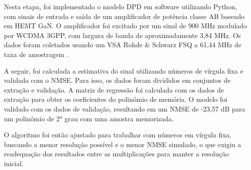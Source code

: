 Nesta etapa, foi implementado o modelo DPD em software utilizando Python, com sinais de entrada e saída de um amplificador de potência classe AB baseado em HEMT GaN. O amplificador foi excitado por um sinal de 900 MHz modulado por WCDMA 3GPP, com largura de banda de aproximadamente 3,84 MHz. Os dados foram coletados usando um VSA Rohde \& Schwarz FSQ a 61,44 MHz de taxa de amostragem \cite{Bonfim2016}. 

A seguir, foi calculada a estimativa do sinal utilizando números de vírgula fixa e validada com o NMSE. Para isso, os dados foram divididos em conjuntos de extração e validação. A matriz de regressão foi calculada com os dados de extração para obter os coeficientes do polinômio de memória. O modelo foi validado com os dados de validação, resultando em um NMSE de -23,57 dB para um polinômio de 2° grau com uma amostra memorizada.

O algoritmo foi então ajustado para trabalhar com números em vírgula fixa, buscando a menor resolução possível e o menor NMSE simulado, o que exigiu a readequação dos resultados entre as multiplicações para manter a resolução inicial.